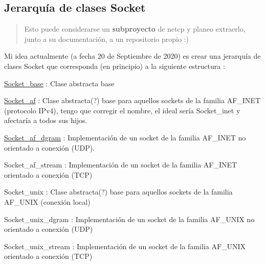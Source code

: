 \subsection*{Jerarquía de clases Socket}

\begin{quote}
Esto puede considerarse un {\bfseries subproyecto} de {\ttfamily netcp} y planeo extraerlo, junto a su documentación, a un repositorio propio \+:)~\newline
~\newline
 \end{quote}
Mi idea actualmente (a fecha 20 de Septiembre de 2020) es crear una jerarquía de clases Socket que corresponda (en principio) a la siguiente estructura \+:


\begin{DoxyItemize}
\item \hyperlink{classSocket__base}{Socket\+\_\+base} \+: Clase abstracta base
\begin{DoxyItemize}
\item \hyperlink{classSocket__af}{Socket\+\_\+af} \+: Clase abstracta(?) base para aquellos sockets de la familia A\+F\+\_\+\+I\+N\+ET (protocolo I\+Pv4), tengo que corregir el nombre, el ideal sería {\ttfamily Socket\+\_\+inet} y afectaría a todos sus hijos.
\begin{DoxyItemize}
\item \hyperlink{classSocket__af__dgram}{Socket\+\_\+af\+\_\+dgram} \+: Implementación de un socket de la familia A\+F\+\_\+\+I\+N\+ET no orientado a conexión (U\+DP).
\item Socket\+\_\+af\+\_\+stream \+: Implementación de un socket de la familia A\+F\+\_\+\+I\+N\+ET orientado a conexión (T\+CP)
\end{DoxyItemize}
\item Socket\+\_\+unix \+: Clase abstracta(?) base para aquellos sockets de la familia A\+F\+\_\+\+U\+N\+IX (conexión local)
\begin{DoxyItemize}
\item Socket\+\_\+unix\+\_\+dgram \+: Implementación de un socket de la familia A\+F\+\_\+\+U\+N\+IX no orientado a conexión (U\+DP)
\item Socket\+\_\+unix\+\_\+stream \+: Implementación de un socket de la familia A\+F\+\_\+\+U\+N\+IX orientado a conexión (T\+CP) 
\end{DoxyItemize}
\end{DoxyItemize}
\end{DoxyItemize}